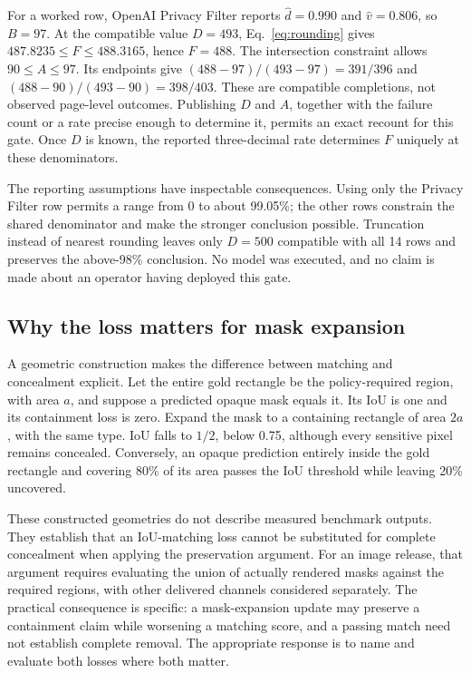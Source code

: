 \documentclass[conference]{IEEEtran}
\begin{document}
For a worked row, OpenAI Privacy Filter reports $\widehat d=0.990$ and $\widehat v=0.806$, so $B=97$. At the compatible value $D=493$, Eq.~\eqref{eq:rounding} gives $487.8235\leq F\leq488.3165$, hence $F=488$. The intersection constraint allows $90\leq A\leq97$. Its endpoints give $(488-97)/(493-97)=391/396$ and $(488-90)/(493-90)=398/403$. These are compatible completions, not observed page-level outcomes. Publishing $D$ and $A$, together with the failure count or a rate precise enough to determine it, permits an exact recount for this gate. Once $D$ is known, the reported three-decimal rate determines $F$ uniquely at these denominators.

The reporting assumptions have inspectable consequences. Using only the Privacy Filter row permits a range from 0 to about 99.05\%; the other rows constrain the shared denominator and make the stronger conclusion possible. Truncation instead of nearest rounding leaves only $D=500$ compatible with all 14 rows and preserves the above-98\% conclusion. No model was executed, and no claim is made about an operator having deployed this gate.

\subsection{Why the loss matters for mask expansion}
A geometric construction makes the difference between matching and concealment explicit. Let the entire gold rectangle be the policy-required region, with area $a$, and suppose a predicted opaque mask equals it. Its IoU is one and its containment loss is zero. Expand the mask to a containing rectangle of area $2a$, with the same type. IoU falls to $1/2$, below 0.75, although every sensitive pixel remains concealed. Conversely, an opaque prediction entirely inside the gold rectangle and covering 80\% of its area passes the IoU threshold while leaving 20\% uncovered.

These constructed geometries do not describe measured benchmark outputs. They establish that an IoU-matching loss cannot be substituted for complete concealment when applying the preservation argument. For an image release, that argument requires evaluating the union of actually rendered masks against the required regions, with other delivered channels considered separately. The practical consequence is specific: a mask-expansion update may preserve a containment claim while worsening a matching score, and a passing match need not establish complete removal. The appropriate response is to name and evaluate both losses where both matter.
\end{document}

